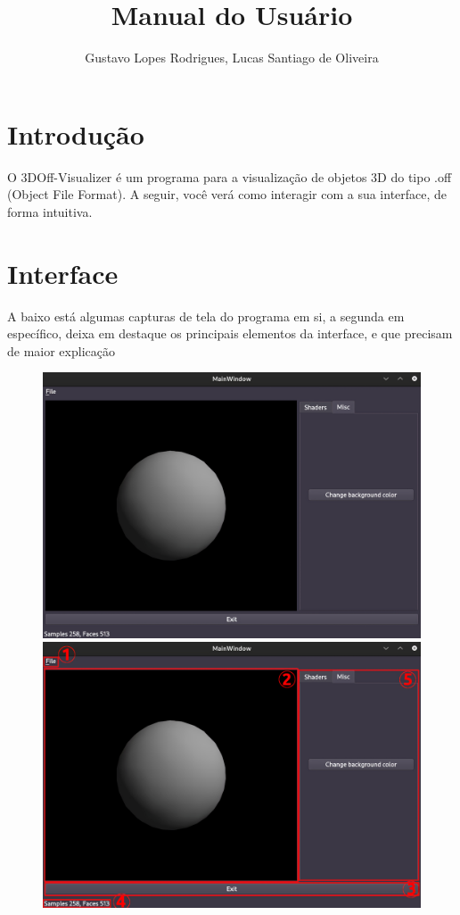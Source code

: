 \documentclass{ol-softwaremanual}
\title{Manual do Usuário}
\author{Gustavo Lopes Rodrigues, Lucas Santiago de Oliveira}
\begin{document}
\maketitle

\tableofcontents
\newpage

\section{Introdução}

O 3DOff-Visualizer é um programa para a visualização de 
objetos 3D do tipo .off (Object File Format). A seguir, você verá
como interagir com a sua interface, de forma intuitiva.

\section{Interface}

A baixo está algumas capturas de tela do programa em si, a segunda 
em específico, deixa em destaque os principais elementos 
da interface, e que precisam de maior explicação

\begin{figure}[ht]
    \centering
    \includegraphics[width=.7\textwidth]{Interface.jpg}
    \includegraphics[width=.7\textwidth]{Interfacemarcada.jpg}
\end{figure}
\end{document}
